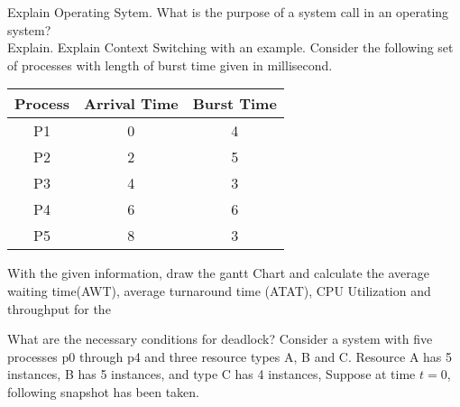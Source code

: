 \marksnotpoints
\pointsdroppedatright
\setlength{\rightpointsmargin}{25mm}
\marginpointname{ \points}
\pointformat{\bfseries\boldmath[\themarginpoints]}

\begin{questions}

\question[1] Explain Operating Sytem. What is the purpose of a system call in an operating system?\\ Explain.\droppoints
\question[10] Explain Context Switching with an example. Consider the following set of processes with length of burst time given in millisecond.\droppoints
\begin{center}
    
    \begin{tabular}{|c|c|c|} \hline 
         Process&  Arrival Time& Burst Time\\ \hline 
         P1&  0& 4\\ \hline 
         P2&  2& 5\\ \hline 
         P3&  4& 3\\ \hline 
         P4&  6& 6\\ \hline 
         P5&  8& 3\\ \hline
    \end{tabular}

\end{center}
With the given information, draw the gantt Chart and calculate the average waiting time(AWT), average turnaround time (ATAT), CPU Utilization and throughput for the


\question[10] What are the necessary conditions for deadlock? Consider a system with five processes p0 through p4 and three resource types A, B and C. Resource A has 5 instances, B has 5 instances, and type C has 4 instances, Suppose at time $t=0$, following snapshot has been taken.

        
    \begin{center}
        





\end{center}
\end{questions}
